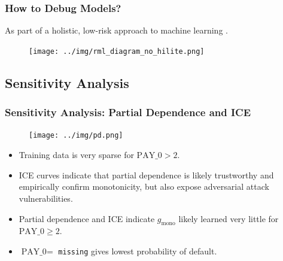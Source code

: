 \documentclass[11pt,
               aspectratio=169,
               hyperref={colorlinks}
               ]{beamer}
\begin{document}
			\begin{frame}
		
				\frametitle{How to Debug Models?}
		
				\footnotesize{As part of a holistic, low-risk approach to machine learning \cite{information}.}
				\begin{figure}
					\begin{center}
						\texttt{[image: ../img/rml\_diagram\_no\_hilite.png]}
					\end{center}
				\end{figure}	
				\normalsize
		
			\end{frame}

		\subsection{Sensitivity Analysis}

			\begin{frame}[t]
		
				\frametitle{\textbf{Sensitivity Analysis}: Partial Dependence and ICE}
				\vspace{-15pt}
				\begin{figure}
					\begin{center}
						\texttt{[image: ../img/pd.png]}
					\end{center}
				\end{figure}
				\vspace{-10pt}
				\begin{itemize}	
					\item \scriptsize Training data is very sparse for $\text{PAY\_0} > 2$.\\
					\item ICE curves indicate that partial dependence is likely trustworthy and empirically confirm monotonicity, but also expose adversarial attack vulnerabilities.
					\item Partial dependence and ICE indicate $g_{\text{mono}}$ likely learned very little for $\text{PAY\_0} \geq 2$.
					\item $\text{PAY\_0} = $ \texttt{missing} gives lowest probability of default.
				\end{itemize}\normalsize
		
			\end{frame}
\end{document}
